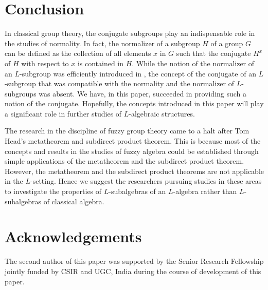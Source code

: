 \documentclass[10pt]{article}
\theoremstyle{plain}
\theoremstyle{definition}
\theoremstyle{remark}
\theoremstyle{case}
\begin{document}
\section{Conclusion}
In classical group theory, the conjugate subgroups play an indispensable role in the studies of normality. In fact, the normalizer of a subgroup $H$ of a group $G$ can be defined as the collection of all elements $x$ in $G$ such that the conjugate $H^x$ of $H$ with respect to $x$ is contained in $H$. While the notion of the normalizer of an $L$-subgroup was efficiently introduced in \cite{ajmal_nor}, the concept of the conjugate of an $L$-subgroup that was compatible with the normality and the normalizer of $L$-subgroups was absent. We have, in this paper, succeeded in providing such a notion of the conjugate. Hopefully, the concepts introduced in this paper will play a significant role in further studies of $L$-algebraic structures. 

The research in the discipline of fuzzy group theory came to a halt after Tom Head’s metatheorem and subdirect product theorem. This is because most of the concepts and results in the studies of fuzzy algebra could be established through simple applications of the metatheorem and the subdirect
product theorem. However, the metatheorem and the subdirect product theorems are not applicable in the $L$-setting. Hence we suggest the researchers pursuing studies in these areas to investigate the properties of $L$-subalgebras of an $L$-algebra rather than $L$-subalgebras of classical algebra.

\section*{Acknowledgements}
The second author of this paper was supported by the Senior Research Fellowship jointly funded by CSIR and UGC, India during the course of development of this paper.
\end{document}
